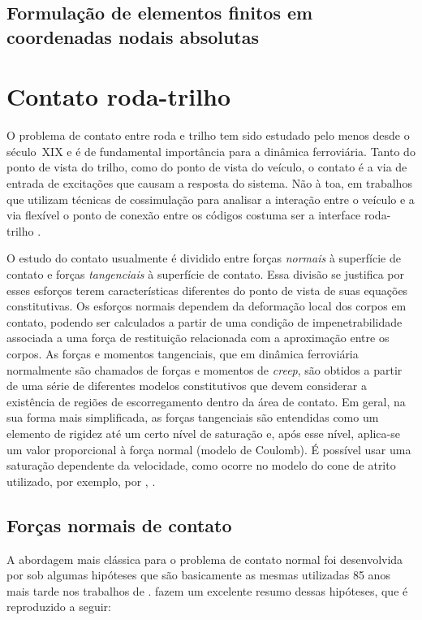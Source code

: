 \subsection{Formulação de elementos finitos em coordenadas nodais absolutas}


\section{Contato roda-trilho}
O problema de contato entre roda e trilho tem sido estudado pelo menos desde o século~XIX e é de fundamental importância para a dinâmica
ferroviária. Tanto do ponto de vista do trilho, como do ponto de vista do veículo, o contato é a via de entrada de excitações que causam 
a resposta do sistema. Não à toa, em trabalhos que utilizam técnicas de cossimulação para analisar a interação entre o veículo e a via
flexível o ponto de conexão entre os códigos costuma ser a interface roda-trilho \cite{pombo_development_2019}.

O estudo do contato usualmente é dividido entre forças \textit{normais} à superfície de contato e forças \textit{tangenciais} à superfície de 
contato. Essa divisão se justifica por esses esforços terem características diferentes do ponto de vista de suas equações constitutivas.
Os esforços normais dependem da deformação local dos corpos em contato, podendo ser calculados a partir de uma condição de impenetrabilidade
associada a uma força de restituição relacionada com a aproximação entre os corpos. As forças e momentos tangenciais, que em dinâmica ferroviária normalmente
são chamados de forças e momentos de \textit{creep}, são obtidos a partir de uma série de diferentes modelos constitutivos que devem considerar a 
existência de regiões de escorregamento dentro da área de contato. Em geral, na sua forma mais simplificada, as forças tangenciais são entendidas como
um elemento de rigidez até um certo nível de saturação e, após esse nível, aplica-se um valor proporcional à força normal (modelo de Coulomb). É possível
usar uma saturação dependente da velocidade, como ocorre no modelo do cone de atrito utilizado, por exemplo, por ,
.

\subsection{Forças normais de contato}
A abordagem mais clássica para o problema de contato normal foi desenvolvida por  sob algumas hipóteses
que são basicamente as mesmas utilizadas 85 anos mais tarde nos trabalhos de \citeauthor{kalker_rolling_1967}. 
fazem um excelente resumo dessas hipóteses, que é reproduzido a seguir:

